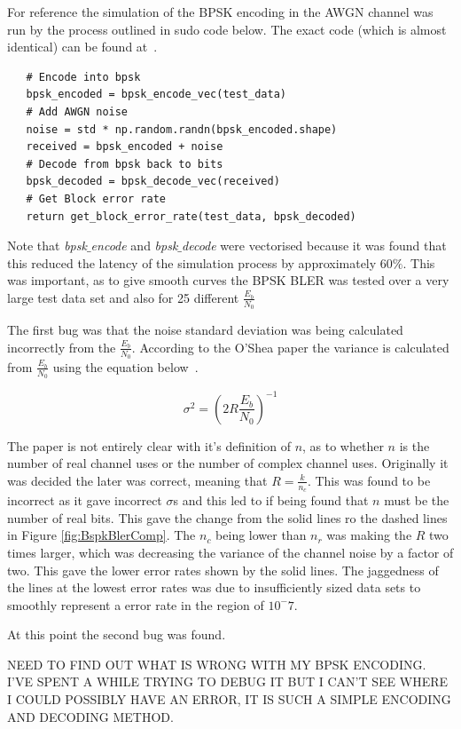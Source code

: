 \documentclass[12pt,onecolumn,letterpaper]{article}
\newcommand{\code}{\textit}
\begin{document}
For reference the simulation of the BPSK encoding in the AWGN channel was run by the process outlined in sudo code below. The exact code (which is almost identical) can be found at~\cite{AwGithub}.

\begin{lstlisting}
   # Encode into bpsk
   bpsk_encoded = bpsk_encode_vec(test_data)
   # Add AWGN noise
   noise = std * np.random.randn(bpsk_encoded.shape)
   received = bpsk_encoded + noise
   # Decode from bpsk back to bits
   bpsk_decoded = bpsk_decode_vec(received)
   # Get Block error rate
   return get_block_error_rate(test_data, bpsk_decoded)
\end{lstlisting}

Note that \code{bpsk$\_$encode} and \code{bpsk$\_$decode} were vectorised because it was found that this reduced the latency of the simulation process by approximately $60\%$. This was important, as to give smooth curves the BPSK BLER was tested over a very large test data set and also for 25 different $\frac{E_b}{N_0}$

The first bug was that the noise standard deviation was being calculated incorrectly from the $\frac{E_b}{N_0}$. According to the O'Shea paper the variance is calculated from $\frac{E_b}{N_0}$ using the equation below~\cite{oShea}.

\begin{equation}
   \sigma^2 = \left(2R\frac{E_b}{N_0} \right)^{-1}
   \label{eq:SigmaFromEbN0}
\end{equation}

The paper is not entirely clear with it's definition of $n$, as to whether $n$ is the number of real channel uses or the number of complex channel uses. Originally it was decided the later was correct, meaning that $R = \frac{k}{n_c}$. This was found to be incorrect as it gave incorrect $\sigma$s and this led to if being found that $n$ must be the number of real bits. This gave the change from the solid lines ro the dashed lines in Figure \ref{fig:BspkBlerComp}. The $n_c$ being lower than $n_r$ was making the $R$ two times larger, which was decreasing the variance of the channel noise by a factor of two. This gave the lower error rates shown by the solid lines. The jaggedness of the lines at the lowest error rates was due to insufficiently sized data sets to smoothly represent a error rate in the region of $10^-7$.

At this point the second bug was found.

NEED TO FIND OUT WHAT IS WRONG WITH MY BPSK ENCODING. I'VE SPENT A WHILE TRYING TO DEBUG IT BUT I CAN'T SEE WHERE I COULD POSSIBLY HAVE AN ERROR, IT IS SUCH A SIMPLE ENCODING AND DECODING METHOD.
\end{document}
